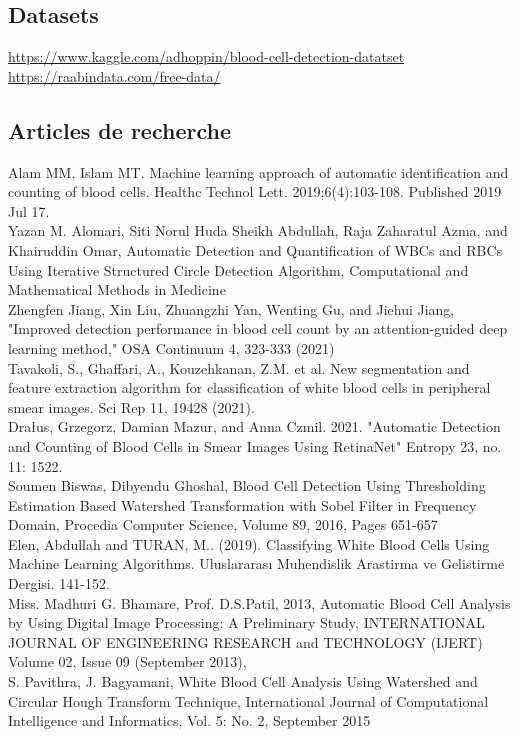\label{references}
\subsection{Datasets}

\url{https://www.kaggle.com/adhoppin/blood-cell-detection-datatset}\\
\url{https://raabindata.com/free-data/}\\

\subsection{Articles de recherche}
Alam MM, Islam MT. Machine learning approach of automatic identification and counting of blood cells. Healthc Technol Lett. 2019;6(4):103-108. Published 2019 Jul 17.\\

Yazan M. Alomari, Siti Norul Huda Sheikh Abdullah, Raja Zaharatul Azma, and Khairuddin Omar, Automatic Detection and Quantification of WBCs and RBCs Using Iterative Structured Circle Detection Algorithm, Computational and Mathematical Methods in Medicine\\

Zhengfen Jiang, Xin Liu, Zhuangzhi Yan, Wenting Gu, and Jiehui Jiang, "Improved detection performance in blood cell count by an attention-guided deep learning method," OSA Continuum 4, 323-333 (2021)\\

Tavakoli, S., Ghaffari, A., Kouzehkanan, Z.M. et al. New segmentation and feature extraction algorithm for classification of white blood cells in peripheral smear images. Sci Rep 11, 19428 (2021).\\

Drałus, Grzegorz, Damian Mazur, and Anna Czmil. 2021. "Automatic Detection and Counting of Blood Cells in Smear Images Using RetinaNet" Entropy 23, no. 11: 1522.\\

Soumen Biswas, Dibyendu Ghoshal, Blood Cell Detection Using Thresholding Estimation Based Watershed Transformation with Sobel Filter in Frequency Domain, Procedia Computer Science, Volume 89, 2016, Pages 651-657\\

Elen, Abdullah and TURAN, M.. (2019). Classifying White Blood Cells Using Machine Learning Algorithms. Uluslararası Muhendislik Arastirma ve Gelistirme Dergisi. 141-152. \\

Miss. Madhuri G. Bhamare, Prof. D.S.Patil, 2013, Automatic Blood Cell Analysis by Using Digital Image Processing: A Preliminary Study, INTERNATIONAL JOURNAL OF ENGINEERING RESEARCH and TECHNOLOGY (IJERT) Volume 02, Issue 09 (September 2013),\\

S. Pavithra, J. Bagyamani, White Blood Cell Analysis Using Watershed and 
Circular Hough Transform Technique, International Journal of Computational Intelligence and Informatics, Vol. 5: No. 2, September 2015\\